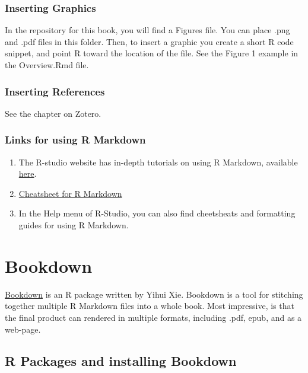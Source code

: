 \documentclass[]{book}
\providecommand{\tightlist}{%
  \setlength{\itemsep}{0pt}\setlength{\parskip}{0pt}}
\theoremstyle{definition}
\theoremstyle{definition}
\theoremstyle{definition}
\theoremstyle{remark}
\begin{document}
\subsection{Inserting Graphics}\label{inserting-graphics}

In the repository for this book, you will find a Figures file. You can
place .png and .pdf files in this folder. Then, to insert a graphic you
create a short R code snippet, and point R toward the location of the
file. See the Figure 1 example in the Overview.Rmd file.

\subsection{Inserting References}\label{inserting-references}

See the chapter on Zotero.

\subsection{Links for using R
Markdown}\label{links-for-using-r-markdown}

\begin{enumerate}
\def\labelenumi{\arabic{enumi}.}
\tightlist
\item
  The R-studio website has in-depth tutorials on using R Markdown,
  available \href{http://rmarkdown.rstudio.com/lesson-1.html}{here}.
\item
  \href{http://rmarkdown.rstudio.com/lesson-15.html}{Cheatsheet for R
  Markdown}
\item
  In the Help menu of R-Studio, you can also find cheetsheats and
  formatting guides for using R Markdown.
\end{enumerate}

\chapter{Bookdown}\label{bookdown-1}

\href{https://bookdown.org/yihui/bookdown/}{Bookdown} is an R package
written by Yihui Xie. Bookdown is a tool for stitching together multiple
R Markdown files into a whole book. Most impressive, is that the final
product can rendered in multiple formats, including .pdf, epub, and as a
web-page.

\section{R Packages and installing
Bookdown}\label{r-packages-and-installing-bookdown}
\end{document}
